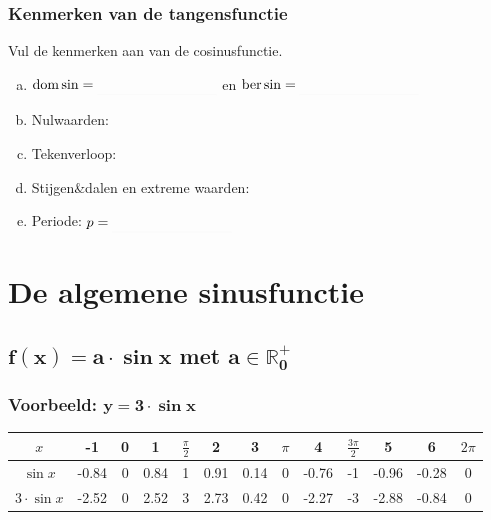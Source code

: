 \documentclass[a4paper,12pt]{article}
\begin{document}
\subsubsection{Kenmerken van de tangensfunctie}
\begin{oefening}
Vul de kenmerken aan van de cosinusfunctie.
\begin{enumerate}[(a)]
  \item $\dom \sin=\arule{3cm}$ en $\ber \sin=\arule{3cm}$
  \item Nulwaarden:
  \item Tekenverloop: 
  \begin{center}
    \visgraad{10cm}
  \end{center}
  \item Stijgen\&dalen en extreme waarden:
  \begin{center}
    \visgraad{10cm}
  \end{center}
  \item Periode: $p=\arule{3cm}$
\end{enumerate}
\end{oefening}

\newpage
\section{De algemene sinusfunctie}

\subsection{$\boldsymbol{f(x)=a\cdot\sin x}$ met $\boldsymbol{a\in \mathbb{R}^+_{0}}$}

\subsubsection{Voorbeeld: $\boldsymbol{y=3\cdot\sin x}$}


\begin{adjustwidth}{-2.5cm}{-2.5cm}
\begin{center}
\scriptsize
  \begin{tabular}{c|c|c|c|c|c|c|c|c|c|c|c|c}
    $x$ & -1 & 0 & 1 &  $\frac{\pi}{2}$ & 2 & 3 & $\pi$ & 4 & $\frac{3\pi}{2}$ & 5 & 6 & $2\pi$\\
    \hline
   $\sin x$ &-0.84&0&0.84&1&0.91&0.14&0&-0.76&-1&-0.96&-0.28 &0\\
    \hline
   $3\cdot\sin x$ &-2.52&0&2.52&3&2.73&0.42&0&-2.27&-3&-2.88&-0.84 &0
  \end{tabular}
\end{center}
\end{adjustwidth}
\end{document}
